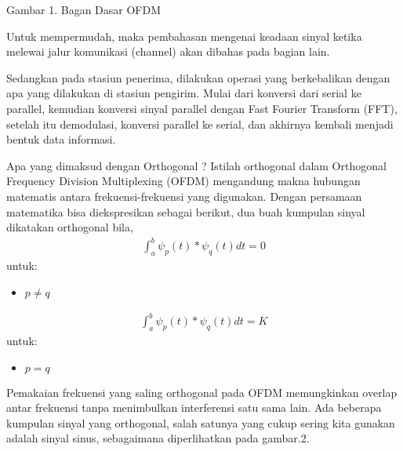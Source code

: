 \documentclass{article}
\begin{document}
Gambar 1. Bagan Dasar OFDM   

Untuk mempermudah, maka pembahasan mengenai keadaan sinyal ketika melewai jalur komunikasi (channel) akan dibahas pada bagian lain.  

Sedangkan pada stasiun penerima, dilakukan operasi yang berkebalikan dengan apa yang dilakukan di stasiun pengirim. Mulai dari konversi dari serial ke parallel, kemudian konversi sinyal parallel dengan Fast Fourier Transform (FFT), setelah itu demodulasi, konversi parallel ke serial, dan akhirnya kembali menjadi bentuk data informasi.

Apa yang dimaksud dengan Orthogonal ?
Istilah orthogonal dalam Orthogonal Frequency Division Multiplexing (OFDM) mengandung makna hubungan matematis antara frekuensi-frekuensi yang digunakan. Dengan persamaan matematika bisa diekspresikan sebagai berikut, dua buah kumpulan sinyal dikatakan orthogonal bila,  
\begin{align}
    \boxed{\int_{a}^{b} \psi_p(t)*\psi_q(t)dt=0 }\nonumber
\end{align}
untuk:
\begin{itemize}
    \item $p \neq q$
\end{itemize}
\begin{align}
    \boxed{\int_{a}^{b} \psi_p(t)*\psi_q(t)dt=K }\nonumber
\end{align}
untuk:
\begin{itemize}
    \item $p = q$
\end{itemize}

Pemakaian frekuensi yang saling orthogonal pada OFDM memungkinkan overlap antar frekuensi tanpa menimbulkan interferensi satu sama lain. Ada beberapa kumpulan sinyal yang orthogonal, salah satunya yang cukup sering kita gunakan adalah sinyal sinus, sebagaimana diperlihatkan pada gambar.2.  
\end{document}
